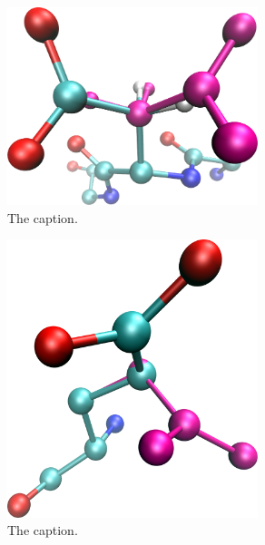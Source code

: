 \begin{figure}[h]
  \centering
  \includegraphics[width=0.65\textwidth]{figures/mutation_side_chain_images/1dvf_chain_b_100.png}
  \caption{The caption.}
  \label{figure:computational_mutation_scanning/figname}
\end{figure}


\begin{figure}[h]
  \centering
  \includegraphics[width=0.65\textwidth]{figures/mutation_side_chain_images/1brs_chain_d_80.png}
  \caption{The caption.}
  \label{figure:computational_mutation_scanning/figname}
\end{figure}

